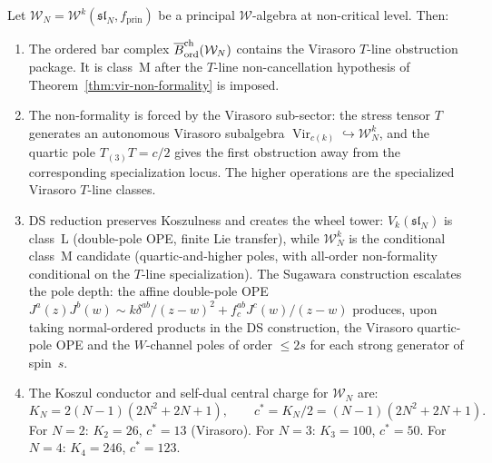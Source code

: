 \begin{theorem}
\label{thm:class-m-ds-transport}
Let $\mathcal{W}_N = \mathcal{W}^k(\mathfrak{sl}_N, f_{\mathrm{prin}})$ be a
principal $\mathcal{W}$-algebra at non-critical level. Then:
\begin{enumerate}[label=\textup{(\roman*)}]
\item The ordered bar complex
$\overline{B}^{\mathrm{ch}}_{\mathrm{ord}}(\mathcal{W}_N)$ contains the Virasoro $T$-line
obstruction package. It is class~$\mathrm{M}$ after the $T$-line
non-cancellation hypothesis of Theorem~\ref{thm:vir-non-formality} is
imposed.

\item The non-formality is forced by the Virasoro sub-sector:
the stress tensor $T$ generates an autonomous Virasoro subalgebra
$\operatorname{Vir}_{c(k)} \hookrightarrow \mathcal{W}_N^k$, and
the quartic pole $T_{(3)}T = c/2$ gives the first obstruction away from
the corresponding specialization locus. The higher operations are the
specialized Virasoro $T$-line classes.

\item DS reduction preserves Koszulness and creates the wheel tower:
$V_k(\mathfrak{sl}_N)$ is class~$\mathrm{L}$ \textup{(}double-pole
OPE, finite Lie transfer\textup{)}, while
$\mathcal{W}_N^k$ is the conditional class~$\mathrm{M}$ candidate
\textup{(}quartic-and-higher poles, with all-order non-formality
conditional on the $T$-line specialization\textup{)}. The Sugawara
construction escalates the pole depth:
the affine double-pole OPE $J^a(z)J^b(w) \sim k\delta^{ab}/(z{-}w)^2
+ f^{ab}_c J^c(w)/(z{-}w)$ produces, upon taking normal-ordered
products in the DS construction, the Virasoro quartic-pole OPE and
the $W$-channel poles of order $\leq 2s$ for each strong generator
of spin~$s$.

\item The Koszul conductor and self-dual central charge for
 $\mathcal{W}_N$ are:
\[
K_N = 2(N{-}1)(2N^2{+}2N{+}1),
\qquad
c^* = K_N/2 = (N{-}1)(2N^2{+}2N{+}1).
\]
For $N = 2$: $K_2 = 26$, $c^* = 13$ \textup{(}Virasoro\textup{)}.
For $N = 3$: $K_3 = 100$, $c^* = 50$.
For $N = 4$: $K_4 = 246$, $c^* = 123$.
\end{enumerate}
\end{theorem}

